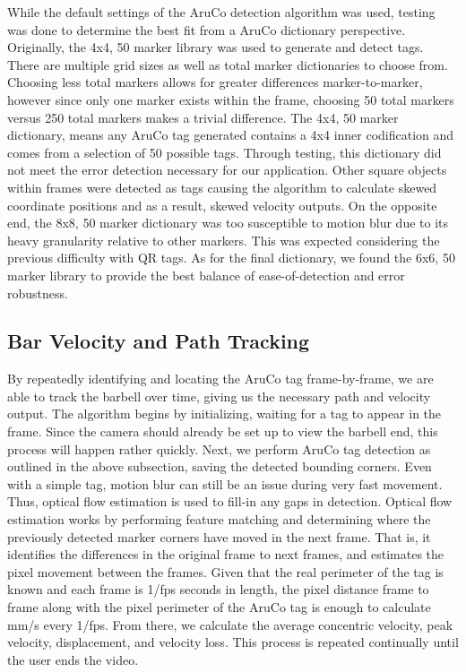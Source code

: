 \documentclass[10pt,twocolumn]{article}
\begin{document}
While the default settings of the AruCo detection algorithm was used, testing was done to determine the best fit from a AruCo dictionary perspective.
Originally, the 4x4, 50 marker library was used to generate and detect tags.
There are multiple grid sizes as well as total marker dictionaries to choose from.
Choosing less total markers allows for greater differences marker-to-marker, however since only one marker exists within the frame, choosing 50 total markers versus 250 total markers makes a trivial difference.
The 4x4, 50 marker dictionary, means any AruCo tag generated contains a 4x4 inner codification and comes from a selection of 50 possible tags.
Through testing, this dictionary did not meet the error detection necessary for our application.
Other square objects within frames were detected as tags causing the algorithm to calculate skewed coordinate positions and as a result, skewed velocity outputs.
On the opposite end, the 8x8, 50 marker dictionary was too susceptible to motion blur due to its heavy granularity relative to other markers. 
This was expected considering the previous difficulty with QR tags.
As for the final dictionary, we found the 6x6, 50 marker library to provide the best balance of ease-of-detection and error robustness. \par

\subsection{Bar Velocity and Path Tracking}
By repeatedly identifying and locating the AruCo tag frame-by-frame, we are able to track the barbell over time, giving us the necessary path and velocity output. 
The algorithm begins by initializing, waiting for a tag to appear in the frame.
Since the camera should already be set up to view the barbell end, this process will happen rather quickly.
Next, we perform AruCo tag detection as outlined in the above subsection, saving the detected bounding corners.
Even with a simple tag, motion blur can still be an issue during very fast movement.
Thus, optical flow estimation is used to fill-in any gaps in detection.
Optical flow estimation works by performing feature matching and determining where the previously detected marker corners have moved in the next frame.
That is, it identifies the differences in the original frame to next frames, and estimates the pixel movement between the frames.
Given that the real perimeter of the tag is known and each frame is 1/fps seconds in length, the pixel distance frame to frame along with the pixel perimeter of the AruCo tag is enough to calculate mm/s every 1/fps.
From there, we calculate the average concentric velocity, peak velocity, displacement, and velocity loss. 
This process is repeated continually until the user ends the video. \par
\end{document}
